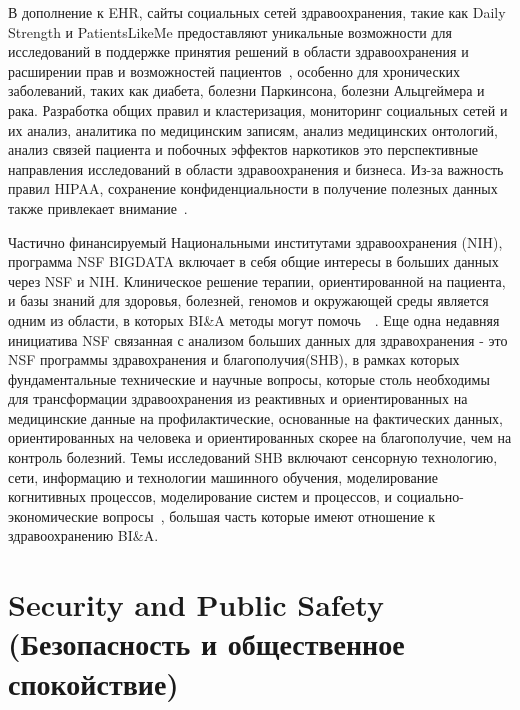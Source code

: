 В дополнение к EHR, сайты социальных сетей здравоохранения, такие как Daily
Strength и PatientsLikeMe предоставляют уникальные возможности для исследований
в поддержке принятия решений в области здравоохранения и расширении прав и возможностей пациентов~\cite{Miller:2012b}, особенно для хронических заболеваний, таких как
диабета, болезни Паркинсона, болезни Альцгеймера и рака. Разработка
общих правил и кластеризация, мониторинг социальных сетей
и их анализ, аналитика по медицинским записям, анализ медицинских онтологий, анализ связей пациента и побочных эффектов наркотиков это
перспективные направления исследований в области здравоохранения и бизнеса. Из-за
важность правил HIPAA, сохранение конфиденциальности в
получение полезных данных также привлекает внимание~\cite{Gelfand:2012}.

Частично финансируемый Национальными институтами здравоохранения (NIH),
программа NSF BIGDATA включает в себя общие
интересы в больших данных через NSF и NIH. Клиническое решение
терапии, ориентированной на пациента, и базы знаний для
здоровья, болезней, геномов и окружающей среды является одним из
области, в которых BI\&A методы могут помочь~\cite{Chen:2011b}~\cite{Wactlar:2011}. Еще одна недавняя инициатива NSF
связанная с анализом больших данных для здравохранения - это NSF программы здравохранения и благополучия(SHB), в рамках которых
фундаментальные технические и научные вопросы, которые
столь необходимы для трансформации здравоохранения из реактивных и
ориентированных на медицинские данные на профилактические, основанные на фактических данных,
ориентированных на человека и ориентированных скорее на благополучие, чем на контроль болезний. Темы исследований SHB включают сенсорную технологию,
сети, информацию и технологии машинного обучения,
моделирование когнитивных процессов, моделирование систем и процессов,
и социально-экономические вопросы~\cite{Wactlar:2011}, большая часть
которые имеют отношение к здравоохранению BI\&A.

\section{Security and Public Safety (Безопасность и общественное спокойствие)}

